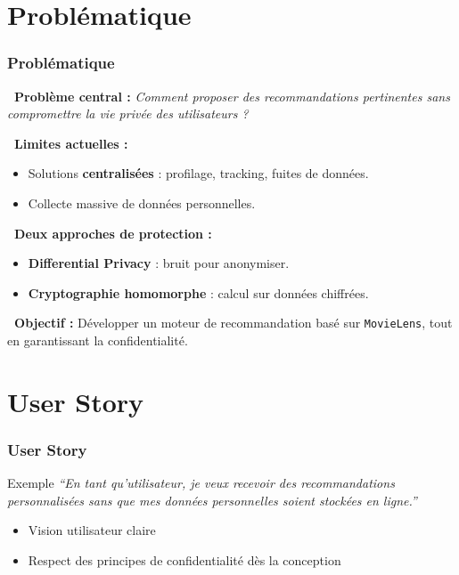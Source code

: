 \documentclass{beamer}
\newcommand{\question}{\ding{72}}   %
\newcommand{\blocked}{\ding{55}}    %
\newcommand{\lock}{\ding{115}}      %
\newcommand{\target}{\ding{93}}     %
\begin{document}
\section{Problématique}
\begin{frame}
    \frametitle{Problématique}

    \small %

    \textbf{\question~Problème central :} 
    \textit{Comment proposer des recommandations pertinentes sans compromettre la vie privée des utilisateurs ?}

    \vspace{0.2cm}
    \textbf{\blocked~Limites actuelles :}
    \begin{itemize}
        \item Solutions \textbf{centralisées} : profilage, tracking, fuites de données.
        \item Collecte massive de données personnelles.
    \end{itemize}

    \textbf{\lock~Deux approches de protection :}
    \begin{itemize}
        \item \textbf{Differential Privacy} : bruit pour anonymiser.
        \item \textbf{Cryptographie homomorphe} : calcul sur données chiffrées.
    \end{itemize}

    \textbf{\target~Objectif :} 
    Développer un moteur de recommandation basé sur \texttt{MovieLens}, tout en garantissant la confidentialité.
\end{frame}

\section{User Story}
\begin{frame}
    \frametitle{User Story}
    \begin{block}{Exemple}
        \textit{“En tant qu’utilisateur, je veux recevoir des recommandations personnalisées sans que mes données personnelles soient stockées en ligne.”}
    \end{block}
    \begin{itemize}
        \item Vision utilisateur claire
        \item Respect des principes de confidentialité dès la conception
    \end{itemize}
\end{frame}
\end{document}
